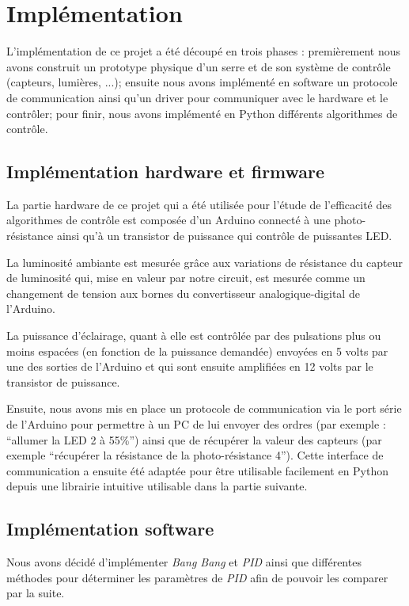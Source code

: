\documentclass[a4paper,10pt]{report}
\begin{document}
\chapter{Implémentation}
\label{chap:impl}

L'implémentation de ce projet a été découpé en trois phases : premièrement nous avons construit un prototype physique d'un serre et de son système de contrôle (capteurs, lumières, ...); ensuite nous avons implémenté en software un protocole de communication ainsi qu'un driver pour communiquer avec le hardware et le contrôler; pour finir, nous avons implémenté en Python différents algorithmes de contrôle.

\section{Implémentation hardware et firmware}

La partie hardware de ce projet qui a été utilisée pour l'étude de l'efficacité des algorithmes de contrôle est composée d'un Arduino connecté à une photo-résistance ainsi qu'à un transistor de puissance qui contrôle de puissantes LED.

La luminosité ambiante est mesurée grâce aux variations de résistance du capteur de luminosité qui, mise en valeur par notre circuit, est mesurée comme un changement de tension aux bornes du convertisseur analogique-digital de l'Arduino.

La puissance d'éclairage, quant à elle est contrôlée par des pulsations plus ou moins espacées (en fonction de la puissance demandée) envoyées en 5 volts par une des sorties de l'Arduino et qui sont ensuite amplifiées en 12 volts par le transistor de puissance.

Ensuite, nous avons mis en place un protocole de communication via le port série de l'Arduino pour permettre à un PC de lui envoyer des ordres (par exemple : ``allumer la LED 2 à 55\%'') ainsi que de récupérer la valeur des capteurs (par exemple ``récupérer la résistance de la photo-résistance 4''). Cette interface de communication a ensuite été adaptée pour être utilisable facilement en Python depuis une librairie intuitive utilisable dans la partie suivante.


\section{Implémentation software}

Nous avons décidé d'implémenter \textit{Bang Bang} et \textit{PID} ainsi que différentes méthodes pour déterminer les paramètres de \textit{PID} afin de pouvoir les comparer par la suite.
\end{document}
